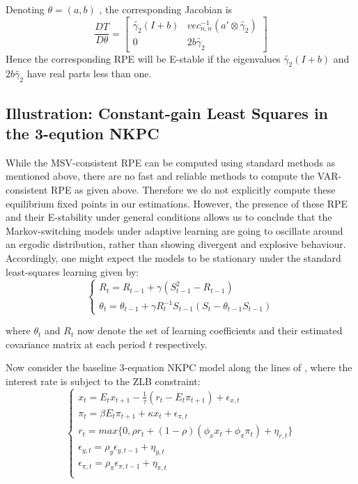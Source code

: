 \documentclass[12pt,reqno]{article}
\numberwithin{equation}{section}
\begin{document}
Denoting $ \theta = (a,b) $ , the corresponding Jacobian is \\

$$
\frac{DT}{ D \theta} = \begin{bmatrix}  \tilde{\gamma_2 } (I+b) & vec^{-1}_{n,n} ( a' \otimes \tilde{\gamma_2}) \\ 0 & 2 b \tilde{\gamma_2}  \end{bmatrix} 
$$
Hence the corresponding RPE will be E-stable if the eigenvalues $\tilde{\gamma_2} (I+b) $ and $ 2 b \tilde{\gamma_2} $ have real parts less than one. \\


\subsection{Illustration: Constant-gain Least Squares in the 3-eqution NKPC}

While the MSV-consistent RPE can be computed using standard methods as mentioned above, there are no fast and reliable methods to compute the VAR-consistent RPE as given above. Therefore we do not explicitly compute these equilibrium fixed points in our estimations. However, the presence of these RPE and their E-stability under general conditions allows us to conclude that the Markov-switching models under adaptive learning are going to oscillate around an ergodic distribution, rather than showing divergent and explosive behaviour. Accordingly, one might expect the models to be stationary under the standard least-squares learning given by: \\


$$
\begin{cases}

R_t = R_{t-1} + \gamma (S_{t-1}^2 - R_{t-1} ) \\
\theta_t = \theta_{t-1} + \gamma R_t^{-1} S_{t-1} (S_t - \theta_{t-1} S_{t-1}) 
\end{cases}
$$

where $\theta_t$ and $R_t$   now denote the set of learning coefficients and their estimated covariance matrix at each period $t$ respectively.  

Now consider the baseline 3-equation NKPC model along the lines of \cite{woodford2013macroeconomic}, where the interest rate is subject to the ZLB constraint: \\

$$
\begin{cases} 
x_t = E_t x_{t+1}  -\frac{1}{\tau}(r_t - E_t \pi_{t+1})+ \epsilon_{x,t} \\
\pi_t = \beta E_t \pi_{t+1} + \kappa x_t + \epsilon_{\pi,t} \\
r_t = max\{ 0, \rho r_t+(1-\rho) (\phi_x x_t + \phi_{\pi} \pi_t )+ \eta_{r,t}\} \\
\epsilon_{y,t} = \rho_y \epsilon_{y,t-1} + \eta_{y,t} \\ 
\epsilon_{\pi,t} = \rho_{\pi} \epsilon_{\pi,t-1} + \eta_{\pi,t} \\
\end{cases} 
$$
\end{document}
